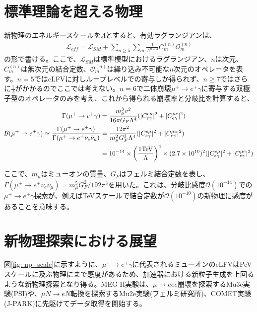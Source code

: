 \documentclass[Yonemoto_master.tex]{subfiles}
\begin{document}
\section{標準理論を超える物理}

新物理のエネルギースケールを$\Lambda$とすると、有効ラグランジアンは、
\begin{align}
\mathcal{L}_{eff} = \mathcal{L}_{SM} + \sum_{n \geq 5} \sum_{m} \frac{1}{\Lambda^{n-4}} C^{(n)}_m \mathcal{O}^{(n)}_m
\end{align}
\noindent の形で書ける\cite{lag_eff}。ここで、$\mathcal{L}_{SM}$は標準模型におけるラグランジアン、$n$は次元、$C^{(n)}_m$は無次元の結合定数、$\mathcal{O}^{(n)}_m$は繰り込み不可能な$n$次元のオペレータを表す。$n=5$ではcLFVに対しループレベルでの寄与しか得られず、$n \geq 7$ではさらに$\frac{1}{\Lambda}$がかかるのでここでは考えない。$n=6$で二体崩壊$\mu^+ \to e^+ \gamma$に寄与する双極子型のオペレータのみを考え、これから得られる崩壊率と分岐比を計算すると、
\begin{align}
\Gamma(\mu^+ \to e^+ \gamma) &= \frac{m^3_\mu v^2}{16\pi G_F \Lambda^4} (|C^{e\mu}_{e\gamma}|^2 + |C^{\mu e}_{e \gamma}|^2) \\
\mathcal{B}(\mu^+ \to e^+ \gamma) \simeq \frac{\Gamma(\mu^+ \to e^+ \gamma)}{\Gamma(\mu^+ \to e^+\nu_e\bar{\nu}_{\mu})} &= \frac{12 \pi^2}{m^2_{\mu} G^3_F \Lambda^4}(|C^{e\mu}_{e\gamma}|^2 + |C^{\mu e}_{e \gamma}|^2) \nonumber \\
&= 10^{-14} \times \left(\frac{1 {\rm TeV}}{\Lambda}\right)^4 \times (2.7 \times 10^{10})^2(|C^{e\mu}_{e\gamma}|^2 + |C^{\mu e}_{e \gamma}|^2 )
\end{align}

\noindent ここで、$m_\mu$はミューオンの質量、$G_F$はフェルミ結合定数を表し、$\Gamma(\mu^+ \to e^+\nu_e\bar{\nu}_{\mu}) = m^5_{\mu} G^2_F / 192 \pi^3$を用いた。これは、分岐比感度$\mathcal{O}(10^{-14})$での$\mu^+ \to e^+ \gamma$探索が、例えばTeVスケールで結合定数が$\mathcal{O}(10^{-10})$の新物理に感度があることを意味する。

\section{新物理探索における展望}
図\ref{fig: np_scale}に示すように、$\mu^+ \to e^+ \gamma$に代表されるミューオンのcLFVはPeVスケールに及ぶ物理にまで感度があるため、加速器における新粒子生成を上回るような新物理探索となり得る。MEG II実験は、$\mu \to eee$崩壊を探索するMu3e実験(PSI)や、$\mu N \to eN$転換を探索するMu2e実験(フェルミ研究所)、COMET実験(J-PARK)に先駆けてデータ取得を開始する。
\end{document}
